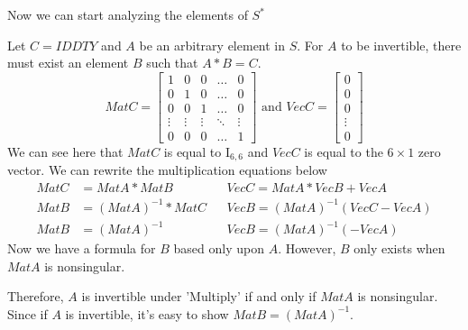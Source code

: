 \documentclass[12pt,letterpaper]{article}
\begin{document}
\begin{itemize}
        Now we can start analyzing the elements of $S^*$
        
        Let $C=IDDTY$ and $A$ be an arbitrary element in $S$. For $A$ to be invertible, there must exist an element $B$ such that $A*B=C$.
        \begin{equation*}
            MatC = 
            \begin{bmatrix}
                1       & 0         & 0         &\dots      & 0 \\
                0       & 1         & 0         &\dots      & 0 \\
                0       & 0         & 1         &\dots      & 0 \\
                \vdots  &\vdots     &\vdots     &\ddots     &\vdots \\
                0       & 0         & 0         &\dots      & 1
            \end{bmatrix}
            \text{ and }VecC =
            \begin{bmatrix}
                0\\
                0\\
                0\\
                \vdots\\
                0
            \end{bmatrix}
        \end{equation*}
        We can see here that $MatC$ is equal to I$_{6,6}$ and $VecC$ is equal to the $6\times 1$ zero vector.
        We can rewrite the multiplication equations below
        \begin{align*}
            MatC &= MatA*MatB  &&VecC=MatA*VecB + VecA\\
            MatB &= (MatA)^{-1}*MatC &&VecB=(MatA)^{-1}(VecC-VecA)\\
            MatB &= (MatA)^{-1} &&VecB=(MatA)^{-1}(-VecA)
        \end{align*}
        Now we have a formula for $B$ based only upon $A$. However, $B$ only exists when $MatA$ is nonsingular.
        
        Therefore, $A$ is invertible under 'Multiply' if and only if $MatA$ is nonsingular. Since if $A$ is invertible, it's easy to show $MatB=(MatA)^{-1}$.
        

\end{itemize}
\end{document}
